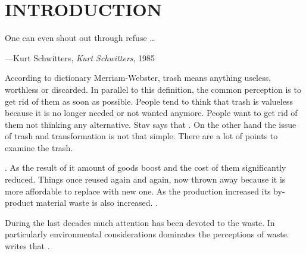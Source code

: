 \chapter{INTRODUCTION}



\begin{singlespace}
\epigraph{One can even shout out through refuse \ldots}{\hfill---Kurt Schwitters, \textit{Kurt Schwitters}, 1985}
\end{singlespace}



According to dictionary Merriam-Webster, trash means anything useless, worthless or discarded. In parallel to this definition, the common perception is to get rid of them as soon as possible. People tend to think that trash is valueless because it is no longer needed or not wanted anymore. People want to get rid of them not thinking any alternative. Stav says that  \citep[as cited in][]{navarro2015followingtrash}. On the other hand the issue of trash and transformation is not that simple. There are a lot of points to examine the trash.

 \citep{pye2010trashculture}. As the result of it amount of goods boost and the cost of them significantly reduced. Things once reused again and again, now thrown away because it is more affordable to replace with new one. As the production increased its by-product material waste is also increased.  \citep{pye2010trashculture}.

During the last decades much attention has been devoted to the waste. In particularly environmental considerations dominates the perceptions of waste. \cite{ibarra2015beautiful} writes that .

